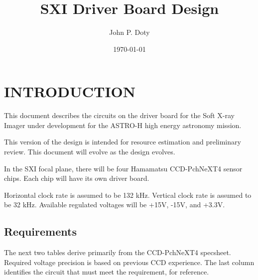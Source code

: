 \documentclass[a4paper,12pt]{article}
\author{John P. Doty}
\date{\today}
\title{SXI Driver Board Design}
\begin{document}
\begin{titlepage}
\maketitle
\end{titlepage} 

\section{INTRODUCTION}
This document describes the circuits on the driver board for the Soft X-ray Imager under development for the ASTRO-H high energy astronomy mission.

This version of the design is intended for resource estimation and preliminary review. This document will evolve as the design evolves.

In the SXI focal plane, there will be four Hamamatsu CCD-PchNeXT4 sensor chips. Each chip will have its own driver board. 

Horizontal clock rate is assumed to be 132 kHz. Vertical clock rate is assumed to be 32 kHz. Available regulated voltages will be +15V, -15V, and +3.3V. 


\subsection{Requirements}
The next two tables derive primarily from the CCD-PchNeXT4 specsheet. Required voltage precision is based on previous CCD experience. The last column identifies the circuit that must meet the requirement, for reference.
\end{document}

